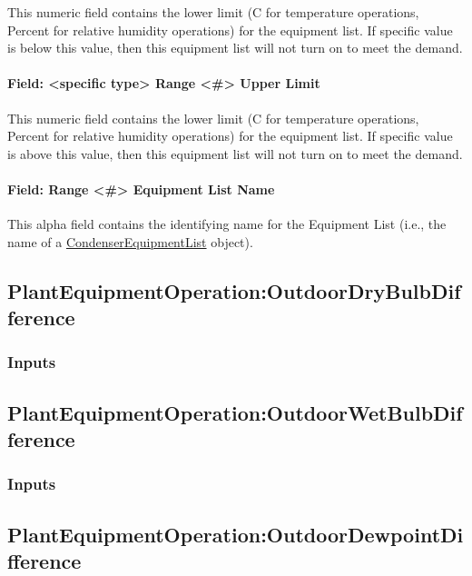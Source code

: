 This numeric field contains the lower limit (C for temperature operations, Percent for relative humidity operations) for the equipment list. If specific value is below this value, then this equipment list will not turn on to meet the demand.

\paragraph{Field: \textless{}specific type\textgreater{} Range \textless{}\#\textgreater{} Upper Limit}\label{field-specific-type-range-upper-limit}

This numeric field contains the lower limit (C for temperature operations, Percent for relative humidity operations) for the equipment list. If specific value is above this value, then this equipment list will not turn on to meet the demand.

\paragraph{Field: Range \textless{}\#\textgreater{} Equipment List Name}\label{field-range-equipment-list-name-1}

This alpha field contains the identifying name for the Equipment List (i.e., the name of a \hyperref[condenserequipmentlist]{CondenserEquipmentList} object).

\subsection{PlantEquipmentOperation:OutdoorDryBulbDifference}\label{plantequipmentoperationoutdoordrybulbdifference}

\subsubsection{Inputs}\label{inputs-9-013}

\subsection{PlantEquipmentOperation:OutdoorWetBulbDifference}\label{plantequipmentoperationoutdoorwetbulbdifference}

\subsubsection{Inputs}\label{inputs-10-012}

\subsection{PlantEquipmentOperation:OutdoorDewpointDifference}\label{plantequipmentoperationoutdoordewpointdifference}

